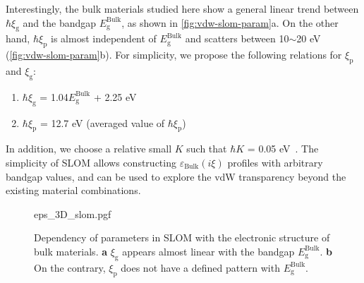 Interestingly, the bulk materials studied here show a general linear
trend between \(\hbar \xi_{\mathrm{g}}\) and the bandgap
\(E_{\mathrm{g}}^{\mathrm{Bulk}}\), as shown in
\autoref{fig:vdw-slom-param}a. On the other hand,
\(\hbar \xi_{\mathrm{p}}\) is almost independent of
\(E_{\mathrm{g}}^{\mathrm{Bulk}}\) and scatters between 10\(\sim\)20
eV (\autoref{fig:vdw-slom-param}b).
%
For simplicity, we propose the
following relations for \(\xi_{\mathrm{p}}\) and \(\xi_{\mathrm{g}}\):
\begin{enumerate}
\item \(\hbar \xi_{\mathrm{g}}\) = 1.04\(E_{\mathrm{g}}^{\mathrm{Bulk}}\) + 2.25 eV
\item \(\hbar \xi_{\mathrm{p}}\) = 12.7 eV (averaged value of \(\hbar
   \xi_{\mathrm{p}}\))
 \end{enumerate}
 In addition, we choose a relative small $K$ such that $\hbar K$ =
 0.05 eV~\citeauthor{Dryden_2015_gecko}.  The simplicity of SLOM
 allows constructing $\varepsilon_{\mathrm{Bulk}}(i \xi)$ profiles
 with arbitrary bandgap values, and can be used to explore the vdW
 transparency beyond the existing material combinations.

\begin{figure}[!htbp]
  \centering{}
  {eps_3D_slom.pgf}
  \caption{\label{fig:vdw-slom-param}%
    Dependency of parameters in SLOM with the electronic structure of
    bulk materials. \textbf{a} $\xi_{\mathrm{g}}$ appears almost
    linear with the bandgap
    $E_{\mathrm{g}}^{\mathrm{Bulk}}$. \textbf{b} On the contrary,
    $\xi_{\mathrm{p}}$ does not have a defined pattern with
    $E_{\mathrm{g}}^{\mathrm{Bulk}}$.
  }
\end{figure}


